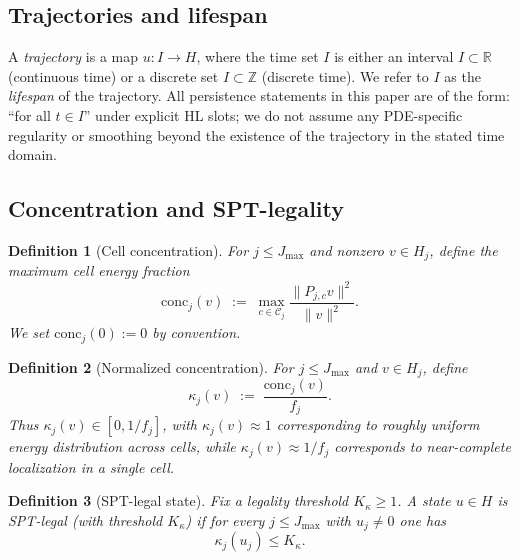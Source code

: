 \documentclass[11pt]{article}
\newcommand{\conc}{\mathrm{conc}}
\newtheorem{definition}{Definition}[section]
\begin{document}
\subsection{Trajectories and lifespan}\label{subsec:traj}

A \emph{trajectory} is a map $u:I\to H$, where the time set $I$ is either an interval $I\subset\mathbb{R}$ (continuous time) or a discrete set $I\subset\mathbb{Z}$ (discrete time).
We refer to $I$ as the \emph{lifespan} of the trajectory.
All persistence statements in this paper are of the form: ``for all $t\in I$'' under explicit HL slots; we do not assume any PDE-specific regularity or smoothing beyond the existence of the trajectory in the stated time domain.

\subsection{Concentration and SPT-legality}

\begin{definition}[Cell concentration]\label{def:cell-conc}
For $j\le J_{\max}$ and nonzero $v\in H_j$, define the maximum cell energy fraction
\begin{equation}\label{eq:conc-def}
\conc_j(v) \;:=\; \max_{c\in\mathcal{C}_j}\frac{\|P_{j,c}v\|^2}{\|v\|^2}.
\end{equation}
We set $\conc_j(0):=0$ by convention.
\end{definition}

\begin{definition}[Normalized concentration]\label{def:kappa-def}
For $j\le J_{\max}$ and $v\in H_j$, define
\begin{equation}\label{eq:kappa-def}
\kappa_j(v) \;:=\; \frac{\conc_j(v)}{f_j}.
\end{equation}
Thus $\kappa_j(v)\in[0,1/f_j]$, with $\kappa_j(v)\approx 1$ corresponding to roughly uniform energy distribution across cells, while $\kappa_j(v)\approx 1/f_j$ corresponds to near-complete localization in a single cell.
\end{definition}

\begin{definition}[SPT-legal state]\label{def:spt-legal}
Fix a legality threshold $K_\kappa\ge 1$.
A state $u\in H$ is \emph{SPT-legal} (with threshold $K_\kappa$) if for every $j\le J_{\max}$ with $u_j\neq 0$ one has
\begin{equation}\label{eq:spt-legal}
\kappa_j(u_j)\le K_\kappa.
\end{equation}
\end{definition}
\end{document}
